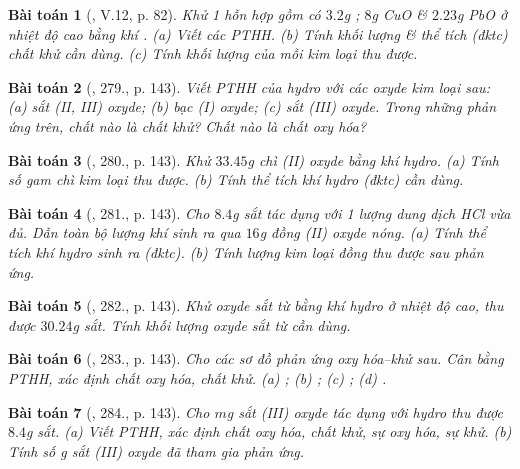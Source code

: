 \documentclass{article}
\newtheorem{baitoan}{Bài toán}
\begin{document}
\begin{baitoan}[\cite{Truong_BTNC_Hoa_Hoc_8_2022}, V.12, p. 82]
	Khử 1 hỗn hợp gồm có $3.2$\emph{g }; $8$\emph{g CuO} \& $2.23$\emph{g PbO} ở nhiệt độ cao bằng khí \emph{}. (a) Viết các PTHH. (b) Tính khối lượng \& thể tích (đktc) chất khử cần dùng. (c) Tính khối lượng của mỗi kim loại thu được.
\end{baitoan}

\begin{baitoan}[\cite{An_400_BT_Hoa_Hoc_8_2020}, 279., p. 143]
	Viết PTHH của hydro với các oxyde kim loại sau: (a) sắt (II, III) oxyde; (b) bạc (I) oxyde; (c) sắt (III) oxyde. Trong những phản ứng trên, chất nào là chất khử? Chất nào là chất oxy hóa?
\end{baitoan}

\begin{baitoan}[\cite{An_400_BT_Hoa_Hoc_8_2020}, 280., p. 143]
	Khử $33.45$\emph{g} chì (II) oxyde bằng khí hydro. (a) Tính số gam chì kim loại thu được. (b) Tính thể tích khí hydro (đktc) cần dùng.
\end{baitoan}

\begin{baitoan}[\cite{An_400_BT_Hoa_Hoc_8_2020}, 281., p. 143]
	Cho $8.4$\emph{g} sắt tác dụng với 1 lượng dung dịch \emph{HCl} vừa đủ. Dẫn toàn bộ lượng khí sinh ra qua $16$\emph{g} đồng (II) oxyde nóng. (a) Tính thể tích khí hydro sinh ra (đktc). (b) Tính lượng kim loại đồng thu được sau phản ứng.
\end{baitoan}

\begin{baitoan}[\cite{An_400_BT_Hoa_Hoc_8_2020}, 282., p. 143]
	Khử oxyde sắt từ bằng khí hydro ở nhiệt độ cao, thu được $30.24$\emph{g} sắt. Tính khối lượng oxyde sắt từ cần dùng.
\end{baitoan}

\begin{baitoan}[\cite{An_400_BT_Hoa_Hoc_8_2020}, 283., p. 143]
	Cho các sơ đồ phản ứng oxy hóa--khử sau. Cân bằng PTHH, xác định chất oxy hóa, chất khử. (a) \emph{}; (b) \emph{}; (c) \emph{}; (d) \emph{}.
\end{baitoan}

\begin{baitoan}[\cite{An_400_BT_Hoa_Hoc_8_2020}, 284., p. 143]
	Cho $m$\emph{g} sắt (III) oxyde tác dụng với hydro thu được $8.4$\emph{g} sắt. (a) Viết PTHH, xác định chất oxy hóa, chất khử, sự oxy hóa, sự khử. (b) Tính số \emph{g} sắt (III) oxyde đã tham gia phản ứng.
\end{baitoan}
\end{document}
